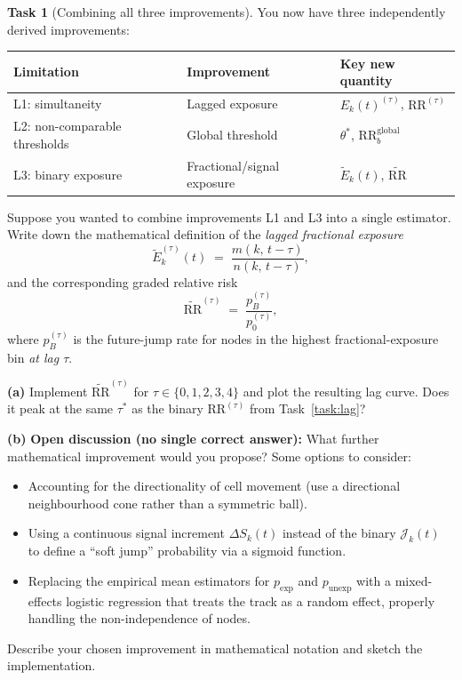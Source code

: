 \documentclass[11pt,a4paper]{article}
\theoremstyle{definition}
\newtheorem{task}{Task}
\newcommand{\dS}[2]{\Delta S_{#1}(#2)}
\newcommand{\JE}[2]{\mathcal{J}_{#1}(#2)}
\newcommand{\expo}[2]{E_{#1}(#2)}
\newcommand{\RR}{\mathrm{RR}}
\newcommand{\pE}{p_{\mathrm{exp}}}
\newcommand{\pU}{p_{\mathrm{unexp}}}
\newcommand{\1}[1]{\mathbf{1}\!\left[#1\right]}
\newcommand{\Thr}{\theta}
\begin{document}
\begin{task}[Combining all three improvements]\label{task:synthesis}
You now have three independently derived improvements:

\begin{center}
\renewcommand{\arraystretch}{1.3}
\begin{tabular}{lll}
\toprule
Limitation & Improvement & Key new quantity \\
\midrule
L1: simultaneity & Lagged exposure & $\expo{k}{t}^{(\tau)}$, $\RR^{(\tau)}$ \\
L2: non-comparable thresholds & Global threshold & $\Thr^*$, $\RR_b^{\mathrm{global}}$ \\
L3: binary exposure & Fractional/signal exposure & $\tilde{E}_k(t)$, $\widetilde{\RR}$ \\
\bottomrule
\end{tabular}
\end{center}

Suppose you wanted to combine improvements L1 and L3 into a single estimator.
Write down the mathematical definition of the \emph{lagged fractional exposure}
\[
  \tilde{E}_k^{(\tau)}(t) \;=\; \frac{m(k,\,t-\tau)}{n(k,\,t-\tau)},
\]
and the corresponding graded relative risk
\[
  \widetilde{\RR}^{(\tau)} \;=\; \frac{p_B^{(\tau)}}{p_0^{(\tau)}},
\]
where $p_B^{(\tau)}$ is the future-jump rate for nodes in the highest
fractional-exposure bin \emph{at lag $\tau$}.

\medskip
\noindent\textbf{(a)} Implement $\widetilde{\RR}^{(\tau)}$ for
$\tau \in \{0, 1, 2, 3, 4\}$ and plot the resulting lag curve.
Does it peak at the same $\tau^*$ as the binary $\RR^{(\tau)}$ from
Task~\ref{task:lag}?



\noindent\textbf{(b)} \textbf{Open discussion (no single correct answer):}
What further mathematical improvement would you propose?
Some options to consider:
\begin{itemize}
  \item Accounting for the directionality of cell movement (use a
        directional neighbourhood cone rather than a symmetric ball).
  \item Using a continuous signal increment $\dS{k}{t}$ instead of the
        binary $\JE{k}{t}$ to define a ``soft jump'' probability via a
        sigmoid function.
  \item Replacing the empirical mean estimators for $\pE$ and $\pU$ with a
        mixed-effects logistic regression that treats the track as a random
        effect, properly handling the non-independence of nodes.
\end{itemize}
Describe your chosen improvement in mathematical notation and sketch
the implementation.



\end{task}
\end{document}
